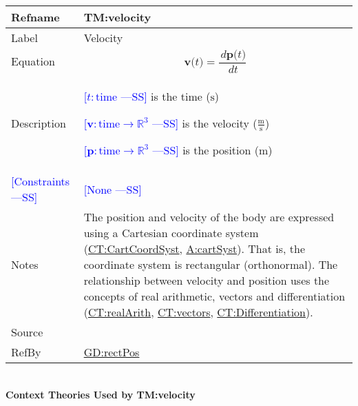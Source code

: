 \documentclass[12pt]{article}
\newcommand{\authornote}[3]{\textcolor{#1}{[#3 ---#2]}}
\newcommand{\authornote}[3]{}
\newcommand{\wss}[1]{\authornote{blue}{SS}{#1}}
\begin{document}
\medskip
\noindent
\begin{minipage}{\textwidth}
\begin{tabular}{>{\raggedright}p{}>{\raggedright\arraybackslash}p{}}
\toprule \textbf{Refname} & \textbf{TM:velocity}
\label{TM:velocity}
\\ \midrule
Label & Velocity
        
\\ \midrule
Equation & \begin{displaymath}
           \symbf{v}\text{(}t\text{)}=\frac{\,d\symbf{p}\text{(}t\text{)}}{\,dt}
           \end{displaymath}
\\ \midrule
Description & \begin{symbDescription}
              \item{\wss{$t: \text{time}$} is the time (${\text{s}}$)}
              \item{\wss{$\symbf{v}: \text{time} \rightarrow \mathbb{R}^3$} is the velocity ($\frac{\text{m}}{\text{s}}$)}
              \item{\wss{$\symbf{p}: \text{time} \rightarrow \mathbb{R}^3$} is the position (${\text{m}}$)}
              \end{symbDescription}
\\ \midrule
\wss{Constraints} & \wss{None}

\\ \midrule
Notes & The position and velocity of the body are expressed using a Cartesian
coordinate system (\hyperref[CT:CartCoordSyst]{CT:CartCoordSyst},
\hyperref[cartSyst]{A:cartSyst}).  That is, the coordinate system is rectangular
(orthonormal).  The relationship between velocity and position uses the concepts
of real arithmetic, vectors and differentiation
(\hyperref[CT:realArith]{CT:realArith}, \hyperref[CT:vectors]{CT:vectors},
\hyperref[CT:Differentiation]{CT:Differentiation}).

\\ \midrule
Source & \cite{velocityWiki}
         
\\ \midrule
RefBy & \hyperref[GD:rectPos]{GD:rectPos}
        
\\ \bottomrule
\end{tabular}
\end{minipage}
~\\
\noindent \textbf{Context Theories Used by TM:velocity}
\end{document}
